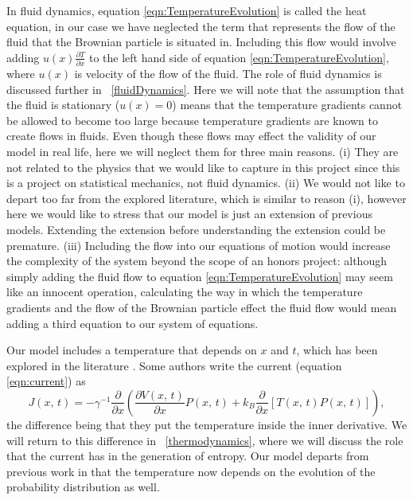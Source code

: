 In fluid dynamics, equation \ref{eqn:TemperatureEvolution} is called the heat equation, in our case we have neglected the term that represents the flow of the fluid that the Brownian particle is situated in. Including this flow would involve adding $u(x) \frac{\partial T}{\partial x}$ to the left hand side of equation \ref{eqn:TemperatureEvolution}, where $u(x)$ is velocity of the flow of the fluid. The role of fluid dynamics is discussed further in ~\autoref{fluidDynamics}. Here we will note that the assumption that the fluid is stationary ($u(x) = 0$) means that the temperature gradients cannot be allowed to become too large because temperature gradients are known to create flows in fluids. Even though these flows may effect the validity of our model in real life, here we will neglect them for three main reasons. (i) They are not related to the physics that we would like to capture in this project since this is a project on statistical mechanics, not fluid dynamics. (ii) We would not like to depart too far from the explored literature, which is similar to reason (i), however here we would like to stress that our model is just an extension of previous models. Extending the extension before understanding the extension could be premature. (iii) Including the flow into our equations of motion would increase the complexity of the system beyond the scope of an honors project: although simply adding the fluid flow to equation \ref{eqn:TemperatureEvolution} may seem like an innocent operation, calculating the way in which the temperature gradients and the flow of the Brownian particle effect the fluid flow would mean adding a third equation to our system of equations.

Our model includes a temperature that depends on $x$ and $t$, which has been explored in the literature \cite{Kramers1940}. Some authors write the current (equation \ref{eqn:current}) as \cite{Kramers1940,Kampen1988}
\begin{equation}
J(x, \, t) = -\gamma^{-1} \frac{\partial}{\partial x} \left (\frac{\partial V(x, \, t)}{\partial x} P(x, \, t) + k_B \frac{\partial}{\partial x}[T(x, \, t) P(x, \, t)] \right ),  \label{eqn:diffCurrent}
\end{equation}
the difference being that they put the temperature inside the inner derivative. We will return to this difference in ~\autoref{thermodynamics}, where we will discuss the role that the current has in the generation of entropy.
Our model departs from previous work in that the temperature now depends on the evolution of the probability distribution as well.

